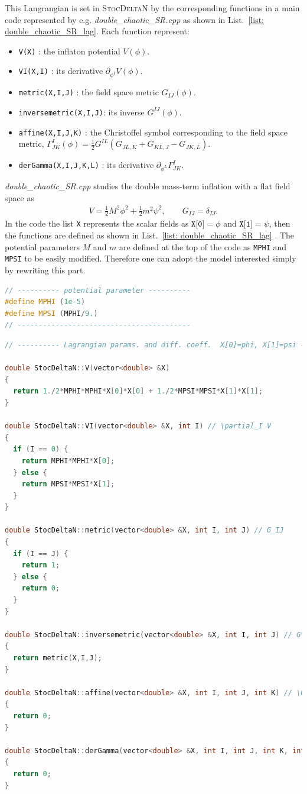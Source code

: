 \documentclass[aps, prd
, preprint
, nofootinbib 
, notitlepage
, superscriptaddress
, longbibliography
]{revtex4-1}
\newcommand{\bae}[1]{\begin{align} #1 \end{align}}
\newcommand{\YT}[1]{\textcolor{blue}{\sffamily [YT : #1]}}
\begin{document}
This Langrangian is set in \textsc{StocDeltaN} by the corresponding functions in a main code represented by e.g. \textit{double\_chaotic\_SR.cpp}
as shown in List.~\ref{list: double_chaotic_SR_lag}.
Each function represent:
\begin{itemize}
\item \texttt{V(X)} : the inflaton potential $V(\phi)$.
\item \texttt{VI(X,I)} : its derivative $\partial_{\phi^I}V(\phi)$.
\item \texttt{metric(X,I,J)} : the field space metric $G_{IJ}(\phi)$.
\item \texttt{inversemetric(X,I,J)}: its inverse $G^{IJ}(\phi)$.
\item \texttt{affine(X,I,J,K)} : the Christoffel symbol corresponding to the field space metric, $\Gamma^I_{JK}(\phi)=\frac{1}{2}G^{IL}(G_{JL,K}+G_{KL,J}-G_{JK,L})$.
\item \texttt{derGamma(X,I,J,K,L)} : its derivative $\partial_{\phi^L}\Gamma^I_{JK}$.
\end{itemize}
\textit{double\_chaotic\_SR.cpp} studies the double mass-term inflation with a flat field space as
\bae{
	V=\frac{1}{2}M^2\phi^2+\frac{1}{2}m^2\psi^2, \qquad G_{IJ}=\delta_{IJ}.
}
In the code the list \texttt{X} represents the scalar fields as $\texttt{X[0]}=\phi$ and $\texttt{X[1]}=\psi$, then the functions are defined as shown 
in List.~\ref{list: double_chaotic_SR_lag} \YT{modify the line number and comments}. The potential parameters $M$ and $m$ are defined at the top of the code as \texttt{MPHI} and \texttt{MPSI} to be easily modified.
Therefore one can adopt the model interested simply by rewriting this part.

\begin{lstlisting}[language = C++, caption={\textit{sample/double\_chaotic\_SR.cpp}}, label=list: double_chaotic_SR_lag, firstnumber = 20]
// ---------- potential parameter ----------
#define MPHI (1e-5)
#define MPSI (MPHI/9.)
// -----------------------------------------
\end{lstlisting}

\begin{lstlisting}[language = C++, firstnumber = 93]
// ---------- Lagrangian params. and diff. coeff.  X[0]=phi, X[1]=psi ----------

double StocDeltaN::V(vector<double> &X)
{
  return 1./2*MPHI*MPHI*X[0]*X[0] + 1./2*MPSI*MPSI*X[1]*X[1];
}

double StocDeltaN::VI(vector<double> &X, int I) // \partial_I V
{
  if (I == 0) {
    return MPHI*MPHI*X[0];
  } else {
    return MPSI*MPSI*X[1];
  }
}

double StocDeltaN::metric(vector<double> &X, int I, int J) // G_IJ
{
  if (I == J) {
    return 1;
  } else {
    return 0;
  }
}

double StocDeltaN::inversemetric(vector<double> &X, int I, int J) // G^IJ
{
  return metric(X,I,J);
}

double StocDeltaN::affine(vector<double> &X, int I, int J, int K) // \Gamma^I_JK
{
  return 0;
}

double StocDeltaN::derGamma(vector<double> &X, int I, int J, int K, int L)
{
  return 0;
}
\end{lstlisting}
\end{document}
